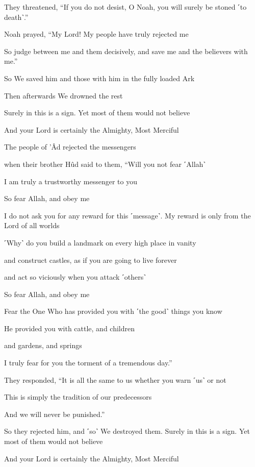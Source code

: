 They threatened, “If you do not desist, O Noah, you will surely be stoned ˹to death˺.”

Noah prayed, “My Lord! My people have truly rejected me

So judge between me and them decisively, and save me and the believers with me.”

So We saved him and those with him in the fully loaded Ark

Then afterwards We drowned the rest

Surely in this is a sign. Yet most of them would not believe

And your Lord is certainly the Almighty, Most Merciful

The people of ’Âd rejected the messengers

when their brother Hûd said to them, “Will you not fear ˹Allah˺

I am truly a trustworthy messenger to you

So fear Allah, and obey me

I do not ask you for any reward for this ˹message˺. My reward is only from the Lord of all worlds

˹Why˺ do you build a landmark on every high place in vanity

and construct castles, as if you are going to live forever

and act so viciously when you attack ˹others˺

So fear Allah, and obey me

Fear the One Who has provided you with ˹the good˺ things you know

He provided you with cattle, and children

and gardens, and springs

I truly fear for you the torment of a tremendous day.”

They responded, “It is all the same to us whether you warn ˹us˺ or not

This is simply the tradition of our predecessors

And we will never be punished.”

So they rejected him, and ˹so˺ We destroyed them. Surely in this is a sign. Yet most of them would not believe

And your Lord is certainly the Almighty, Most Merciful

